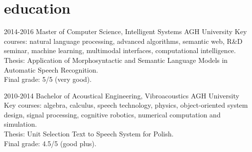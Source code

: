 \documentclass[]{friggeri-cv_osx}
\begin{document}

\begin{center}
\href{http:sebastiandziadzio.com}{\color{gray} \Large \faHome} \hspace{0.05cm}
\href{https://github.com/sebastiandziadzio}{\color{gray} \Large \faGithub} \hspace{0.05cm}
\href{mailto:sebastian.dziadzio@gmail.com}{\color{gray} \Large\faEnvelope} \hspace{0.05cm}
\href{https://twitter.com/sebadzia}{\color{gray} \Large\faTwitter} \hspace{0.05cm}
\href{http://pl.linkedin.com/in/sebastiandziadzio}{\color{gray} \Large\faLinkedin} \hspace{0.05cm}
\end{center}

\section{education}
\begin{entrylist}
\entry
{2014-2016}
{Master of Computer Science, Intelligent Systems}
{AGH University}
{Key courses: natural language processing, advanced algorithms, semantic web, R\&D seminar, machine learning, multimodal interfaces, computational intelligence.\\
Thesis: Application of Morphosyntactic and Semantic Language Models in Automatic Speech Recognition.\\
Final grade: 5/5 (very good).\\}

\entry
{2010-2014}
{Bachelor of Acoustical Engineering, Vibroacoustics}
{AGH University}
{Key courses: algebra, calculus, speech technology, physics, object-oriented system design, signal processing, cognitive robotics, numerical computation and simulation.\\
Thesis: Unit Selection Text to Speech System for Polish.\\
Final grade: 4.5/5 (good plus).\\}
\end{entrylist}
\end{document}
